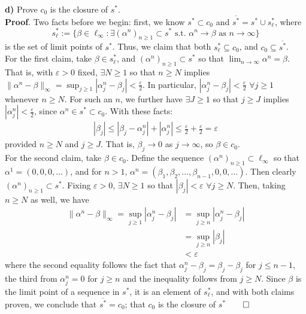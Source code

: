 \documentclass[10pt]{article}
\newcommand{\1}[1]{\mathbbm{1}_{#1}}
\begin{document}
    {\bf d)} Prove $c_0$ is the closure of $s^\ast$.\\[5pt]
    {\bf Proof}. Two facts before we begin: first, we know $s^\ast\subset c_0$ and $\overline{s^\ast}=s^\ast\cup s^\ast_\ell$, where
    \[s^\ast_\ell:=\{\beta\in\ell_\infty:\exists(\alpha^n)_{n\geq 1}\subset s^\ast\text{ s.t. }\alpha^n\rightarrow\beta\text{ as } n\rightarrow\infty\}\]
    is the set of limit points of $s^\ast$. Thus, we claim that both $s^\ast_\ell\subseteq c_0$, and $c_0\subseteq\overline{s^\ast}$.\\[5pt]
    For the first claim, take $\beta\in s^\ast_\ell$, and $(\alpha^n)_{n\geq 1}\subset s^\ast$ so that $\lim_{n\rightarrow\infty}\alpha^n=\beta$. That is, with $\varepsilon>0$ fixed, $\exists N\geq 1$ so that
    $n\geq N$ implies $\|\alpha^n-\beta\|_\infty=\sup_{j\geq 1}|\alpha^n_j-\beta_j|<\tfrac{\varepsilon}{2}$. In particular, $|\alpha^n_j-\beta_j|<\tfrac{\varepsilon}{2}$ $\forall j\geq 1$ whenever $n\geq N$. For such an $n$, we further have $\exists J\geq 1$ so that $j\geq J$
    implies $|\alpha^n_j|<\tfrac{\varepsilon}{2}$, since $\alpha^n\in s^\ast\subset c_0$. With these facts:
    \begin{align*}
        |\beta_j|\leq |\beta_j-\alpha^n_j|+|\alpha^n_j|\leq \frac{\varepsilon}{2}+\frac{\varepsilon}{2}=\varepsilon
    \end{align*}
    provided $n\geq N$ and $j\geq J$. That is, $\beta_j\rightarrow 0$ as $j\rightarrow\infty$, so $\beta\in c_0$.\\[5pt]
    For the second claim, take $\beta\in c_0$. Define the sequence $(\alpha^n)_{n\geq 1}\subset\ell_\infty$ so that $\alpha^1=(0,0,0,\dots)$, and for $n>1$, $\alpha^n=(\beta_1,\beta_2,\dots,\beta_{n-1},0,0,\dots)$.
    Then clearly $(\alpha^n)_{n\geq 1}\subset s^\ast$. Fixing $\varepsilon>0$, $\exists N\geq 1$ so that $|\beta_j|<\varepsilon$ $\forall j\geq N$. Then, taking $n\geq N$ as well, we have
    \begin{align*}
        \|\alpha^n-\beta\|_\infty=\sup_{j\geq 1}|\alpha^n_j-\beta_j|&=\sup_{j\geq n}|\alpha^n_j-\beta_j|\\
        &=\sup_{j\geq n}|\beta_j|\\
        &<\varepsilon
    \end{align*}
    where the second equality follows the fact that $\alpha^n_j-\beta_j=\beta_j-\beta_j$ for $j\leq n-1$, the third from $\alpha^n_j=0$ for $j\geq n$ and the inequality follows from $j\geq N$. Since $\beta$ is the limit point of 
    a sequence in $s^\ast$, it is an element of $s^\ast_\ell$, and with both claims proven, we conclude that $\overline{s^\ast}=c_0$; that $c_0$ is the closure of $s^\ast$\hfill{$\qed$}\\[5pt]
\end{document}
